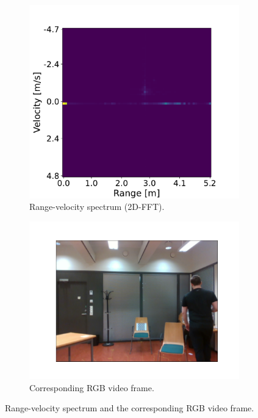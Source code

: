 \begin{figure}[H]
    \centering
    \begin{subfigure}[b]{0.49\textwidth}
        \centering
        \includegraphics[width=\textwidth]{fig/4/range-velocity.pdf}
        \caption{Range-velocity spectrum (2D-FFT).}
        \label{fig:range-velocity-unfiltered}
    \end{subfigure}
    \hfill
    \begin{subfigure}[b]{0.49\textwidth}
        \centering
        \includegraphics[width=\textwidth]{fig/4/range-velocity-rgb.pdf}
        \caption{Corresponding RGB video frame.}
        \label{fig:range-velocity-rgb}
    \end{subfigure}
    \caption{
        Range-velocity spectrum and the corresponding RGB video frame.
    }
\end{figure}

